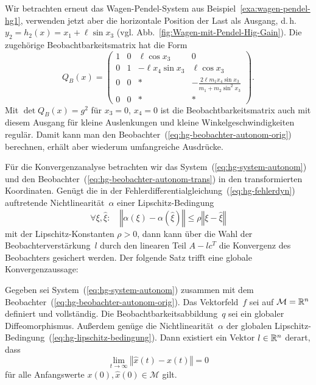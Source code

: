 \begin{example}
\label{exa:wagen-pendel-hg2}Wir betrachten erneut das Wagen-Pendel-System
aus Beispiel~\ref{exa:wagen-pendel-hg1}, verwenden jetzt aber die
horizontale Position der Last als Ausgang, d.\,h. $y_{2}=h_{2}(x)=x_{1}+\ell\sin x_{3}$
(vgl. Abb.~\ref{fig:Wagen-mit-Pendel-Hig-Gain}). Die zugehörige
Beobachtbarkeitsmatrix hat die Form 
\[
Q_{B}(x)=\left(\begin{array}{cccc}
1 & 0 & \ell\cos x_{3} & 0\\
0 & 1 & -\ell x_{4}\sin x_{3} & \ell\cos x_{3}\\
0 & 0 & * & -\frac{2\ell m_{1}x_{4}\sin x_{3}}{m_{1}+m_{2}\sin^{2}x_{3}}\\
0 & 0 & * & *
\end{array}\right).
\]
Mit $\det Q_{B}(x)=g^{2}$ für $x_{3}=0$, $x_{4}=0$ ist die Beobachtbarkeitsmatrix
auch mit diesem Ausgang für kleine Auslenkungen und kleine Winkelgeschwindigkeiten
regulär. Damit kann man den Beobachter~(\ref{eq:hg-beobachter-autonom-orig})
berechnen, erhält aber wiederum umfangreiche Ausdrücke.
\end{example}

Für die Konvergenzanalyse betrachten wir das System~(\ref{eq:hg-system-autonom})
und den Beobachter~(\ref{eq:hg-beobachter-autonom-trans}) in den
transformierten Koordinaten. Genügt die in der Fehlerdifferentialgleichung~(\ref{eq:hg-fehlerdyn})
auftretende Nichtlinearität~$\alpha$ einer Lipschitz-Bedingung
\begin{equation}
\forall\xi,\hat{\xi}:\quad\left\Vert \alpha(\xi)-\alpha(\hat{\xi})\right\Vert \leq\rho\left\Vert \xi-\hat{\xi}\right\Vert \label{eq:hg-lipschitz-bedingung}
\end{equation}
mit der Lipschitz-Konstanten $\rho>0$, dann kann über die Wahl der
Beobachterverstärkung~$l$ durch den linearen Teil $A-lc^{T}$ die
Konvergenz des Beobachters gesichert werden. Der folgende Satz trifft
eine globale Konvergenzaussage:
\begin{theorem}
\label{thm:hg-konvergenz-autonom}Gegeben sei System~(\ref{eq:hg-system-autonom})
zusammen mit dem Beobachter~(\ref{eq:hg-beobachter-autonom-orig}).
Das Vektorfeld~$f$ sei auf $\mathcal{M}={\mathbb{R}}^{n}$ definiert und vollständig.
Die Beobachtbarkeitsabbildung~$q$ sei ein globaler Diffeomorphismus.
Außerdem genüge die Nichtlinearität~$\alpha$ der globalen Lipschitz-Bedingung~(\ref{eq:hg-lipschitz-bedingung}).
Dann existiert ein Vektor $l\in{\mathbb{R}}^{n}$ derart, dass 
\begin{equation}
\lim_{t\to\infty}\left\Vert \hat{x}(t)-x(t)\right\Vert =0\label{eq:hg-konvergenz}
\end{equation}
für alle Anfangswerte $x(0),\hat{x}(0)\in\mathcal{M}$ gilt.
\end{theorem}

